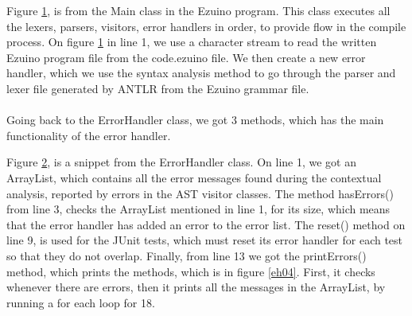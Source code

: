 \begin{figure}[H]
\centering
{}
\caption{}
\label{eh02}
\end{figure}
Figure \ref{eh02}, is from the Main class in the Ezuino program. This class executes all the lexers, parsers, visitors, error handlers in order, to provide flow in the compile process. On figure \ref{eh02} in line 1, we use a character stream to read the written Ezuino program file from the code.ezuino file. We then create a new error handler, which we use the syntax analysis method to go through the parser and lexer file generated by ANTLR from the Ezuino grammar file. \\
\\
Going back to the ErrorHandler class, we got 3 methods, which has the main functionality of the error handler. 
\begin{figure}[H]
\centering
{}
\caption{}
\label{eh03}
\end{figure}
Figure \ref{eh03}, is a snippet from the ErrorHandler class. On line 1, we got an ArrayList, which contains all the error messages found during the contextual analysis, reported by errors in the AST visitor classes. The method hasErrors() from line 3, checks the ArrayList mentioned in line 1, for its size, which means that the error handler has added an error to the error list. The reset() method on line 9, is used for the JUnit tests, which must reset its error handler for each test so that they do not overlap. Finally, from line 13 we got the printErrors() method, which prints the methods, which is in figure \ref{eh04}. First, it checks whenever there are errors, then it prints all the messages in the ArrayList, by running a for each loop for 18. 
